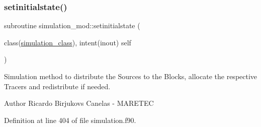 \subsubsection{\texorpdfstring{setinitialstate()}{setinitialstate()}}
{\footnotesize\ttfamily subroutine simulation\+\_\+mod\+::setinitialstate (\begin{DoxyParamCaption}\item[{class(\mbox{\hyperlink{structsimulation__mod_1_1simulation__class}{simulation\+\_\+class}}), intent(inout)}]{self }\end{DoxyParamCaption})\hspace{0.3cm}{\ttfamily [private]}}



Simulation method to distribute the Sources to the Blocks, allocate the respective Tracers and redistribute if needed. 

\begin{DoxyAuthor}{Author}
Ricardo Birjukovs Canelas -\/ M\+A\+R\+E\+T\+EC 
\end{DoxyAuthor}


Definition at line 404 of file simulation.\+f90.


